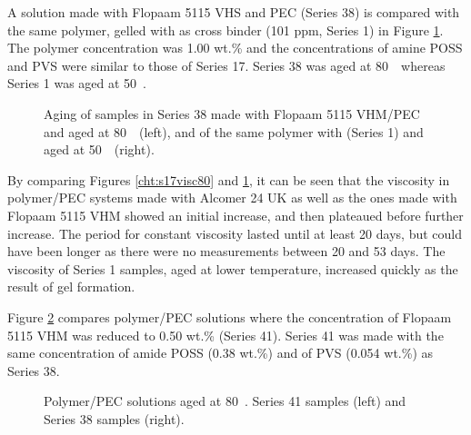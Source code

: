 A solution made with Flopaam 5115 VHS and PEC (Series 38) is compared with the same polymer, gelled with  as cross binder (101 ppm, Series 1) in Figure \ref{cht:s38visc80}. The polymer concentration was 1.00 wt.\% and the concentrations of amine POSS and PVS were similar to those of Series 17. Series 38 was aged at 80~\celsius~whereas Series 1 was aged at 50~\celsius.

\begin{figure}[h]
    \centering
    \caption{Aging of samples in Series 38 made with Flopaam 5115 VHM/PEC and aged at 80~\celsius~(left), and of the same polymer with  (Series 1) and aged at 50~\celsius~(right).}
    \label{cht:s38visc80}
\end{figure}

By comparing Figures \ref{cht:s17visc80} and \ref{cht:s38visc80}, it can be seen that the viscosity in polymer/PEC systems made with Alcomer 24 UK as well as the ones made with Flopaam 5115 VHM showed an initial increase, and then plateaued before further increase. The period for constant viscosity lasted until at least 20 days, but could have been longer as there were no measurements between 20 and 53 days. The viscosity of Series 1 samples, aged at lower temperature, increased quickly as the result of gel formation.

Figure \ref{cht:s41visc80} compares polymer/PEC solutions where the concentration of Flopaam 5115 VHM was reduced to 0.50 wt.\% (Series 41). Series 41 was made with the same concentration of amide POSS (0.38 wt.\%) and of PVS (0.054 wt.\%) as Series 38. 

\begin{figure}
    \centering
    \caption{Polymer/PEC solutions aged at 80~\celsius. Series 41 samples (left) and Series 38 samples (right).}
    \label{cht:s41visc80}
\end{figure}

